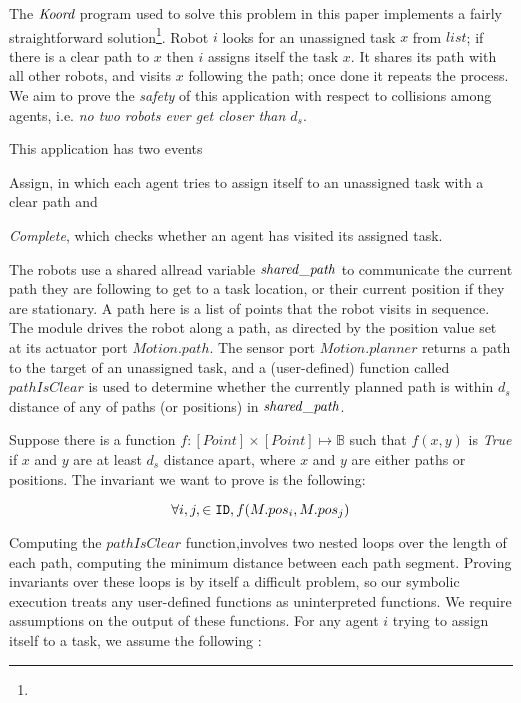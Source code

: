The $\emph{Koord}$ program used to solve this problem in this paper implements a fairly straightforward solution\footnote{}. Robot $i$ looks for an unassigned task $x$ from $\mathit{list}$; if there is a clear path to $x$ then $i$ assigns itself the task $x$. It shares its path with all other robots, and  visits $x$ following the path; once done it repeats the process.  We aim to prove the \emph{safety} of this application with respect to collisions among agents, i.e. \emph{no two robots ever get closer than $d_s$}.



This application has two events \begin{inparaenum} \item {Assign}, in which each agent tries to assign itself to an unassigned task with a clear path  and \item \emph{Complete}, which checks whether an agent has visited its assigned task. \end{inparaenum} The robots use a shared allread variable $\mathit{shared\_path}$ to communicate the current path they are following to get to a task location, or their current position if they are stationary. A path here is a list of points that the robot visits in sequence. The \Motion module drives the robot along a path, as directed by the position value set at its actuator port $\mathit{Motion.path}$. The sensor port $\mathit{Motion.planner}$ returns a path to the target of an unassigned task, and a (user-defined) function called $\mathit{pathIsClear}$ is used to determine whether the currently planned path is within $d_s$ distance of any of paths (or positions) in $\mathit{shared\_path}$.

Suppose there is a function $f : [Point] \times [Point] \mapsto \mathbb{B}$ such that $f(x, y)$ is \emph{True} if $x$ and $y$ are at least $d_s$ distance apart, where $x$ and $y$ are either paths or positions. The invariant we want to prove is the following:

\begin{invariant}
\label{inv:task}
\[
    \forall i,j, \in \texttt{ID}, f(M.pos_i, M.pos_j)
\]
\end{invariant}
\noindent


Computing the $\mathit{pathIsClear}$ function,involves two nested loops over the length of each path, computing the minimum distance between each path segment. Proving invariants over these loops is by itself a difficult problem, so our symbolic execution treats any user-defined functions as uninterpreted functions. We require assumptions on the output of these functions. For any agent $i$ trying to assign itself to a task, we  assume the following :

